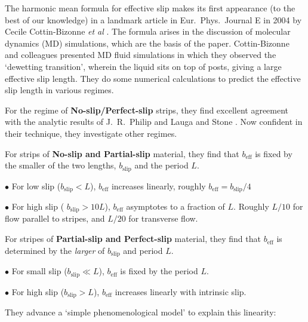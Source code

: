 \documentclass[12pt, a4paper, twoside, openright]{book}
\newcommand{\beff}{\ensuremath{b_{\mathrm{eff}}}}
\begin{document}
The harmonic mean formula for effective slip makes its first appearance (to the best of our knowledge) in a landmark article in Eur.\ Phys.\ Journal E in 2004 by Cecile Cottin-Bizonne \emph{et al} \cite{Cottin-Bizonne2004}.  The formula arises in the discussion of molecular dynamics (MD) simulations, which are the basis of the paper.
Cottin-Bizonne and colleagues presented MD fluid simulations in which they observed the `dewetting transition', wherein the liquid sits on top of posts, giving a large effective slip length.  They do some numerical calculations to predict the effective slip length in various regimes.  

For the regime of \textbf{No-slip/Perfect-slip} strips, they find excellent agreement with the analytic results of J.\ R.\ Philip \cite{Philip1972} and Lauga and Stone \cite{LaugaStone2003}.  Now confident in their technique, they investigate other regimes.

For strips of \textbf{No-slip and Partial-slip} material, they find that $\beff$ is fixed by the smaller of the two lengths, $b_{\mathrm{slip}}$ and the period $L$.

$\bullet$ For low slip ($b_{\mathrm{slip}} < L$), $\beff$ increases linearly, roughly $\beff = b_{\mathrm{slip}} / 4$

$\bullet$ For high slip ( $b_{\mathrm{slip}} > 10L$), $\beff$ asymptotes to a fraction of $L$. Roughly $L/10$ for flow parallel to stripes, and $L/20$ for transverse flow.

\vspace{1em}

For stripes of \textbf{Partial-slip and Perfect-slip} material, they find that $\beff$ is determined by the \emph{larger} of $b_{\mathrm{slip}}$ and period $L$.

$\bullet$ For small slip ($b_{\mathrm{slip}} \ll L$), $\beff$ is fixed by the period $L$.

$\bullet$ For high slip ($b_{\mathrm{slip}} > L$), $\beff$ increases linearly with intrinsic slip.

They advance a `simple phenomenological model' to explain this linearity:
\end{document}
